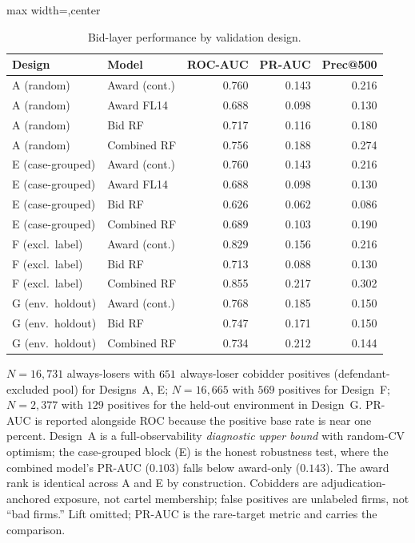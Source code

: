 \begin{table}[htbp]\centering
\begin{adjustbox}{max width=\textwidth,center}
\begin{threeparttable}
\caption{Bid-layer performance by validation design.}
\label{supp:tab_bid_perf}\scriptsize
\begin{tabular}{llrrr}
\toprule
Design & Model & ROC-AUC & PR-AUC & Prec@500 \\
\midrule
A (random)        & Award (cont.) & 0.760 & 0.143 & 0.216 \\
A (random)        & Award FL14    & 0.688 & 0.098 & 0.130 \\
A (random)        & Bid RF        & 0.717 & 0.116 & 0.180 \\
A (random)        & Combined RF   & 0.756 & 0.188 & 0.274 \\
E (case-grouped)  & Award (cont.) & 0.760 & 0.143 & 0.216 \\
E (case-grouped)  & Award FL14    & 0.688 & 0.098 & 0.130 \\
E (case-grouped)  & Bid RF        & 0.626 & 0.062 & 0.086 \\
E (case-grouped)  & Combined RF   & 0.689 & 0.103 & 0.190 \\
F (excl.\ label)  & Award (cont.) & 0.829 & 0.156 & 0.216 \\
F (excl.\ label)  & Bid RF        & 0.713 & 0.088 & 0.130 \\
F (excl.\ label)  & Combined RF   & 0.855 & 0.217 & 0.302 \\
G (env.\ holdout) & Award (cont.) & 0.768 & 0.185 & 0.150 \\
G (env.\ holdout) & Bid RF        & 0.747 & 0.171 & 0.150 \\
G (env.\ holdout) & Combined RF   & 0.734 & 0.212 & 0.144 \\
\bottomrule
\end{tabular}
\begin{tablenotes}\scriptsize
\item $N=16{,}731$ always-losers with $651$ always-loser
cobidder positives (defendant-excluded pool) for Designs~A, E; $N=16{,}665$
with $569$ positives for Design~F; $N=2{,}377$ with $129$ positives for the
held-out environment in Design~G. PR-AUC is reported alongside ROC because
the positive base rate is near one percent. Design~A is a
full-observability \emph{diagnostic upper bound} with random-CV optimism;
the case-grouped block (E) is the honest robustness test, where the
combined model's PR-AUC ($0.103$) falls below award-only ($0.143$). The
award rank is identical across A and E by construction. Cobidders are
adjudication-anchored exposure, not cartel membership; false positives are
unlabeled firms, not ``bad firms.'' Lift omitted; PR-AUC is the
rare-target metric and carries the comparison.
\end{tablenotes}
\end{threeparttable}
\end{adjustbox}
\end{table}

